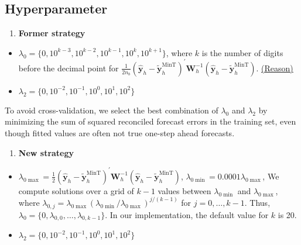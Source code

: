 \documentclass[
  letterpaper,
  DIV=11,
  numbers=noendperiod]{scrartcl}
\providecommand{\tightlist}{%
  \setlength{\itemsep}{0pt}\setlength{\parskip}{0pt}}\usepackage{longtable,booktabs,array}
\begin{document}
\hypertarget{hyperparameter}{%
\subsection{Hyperparameter}\label{hyperparameter}}

\begin{enumerate}
\def\labelenumi{\arabic{enumi}.}
\tightlist
\item
  \textbf{Former strategy}
\end{enumerate}

\begin{itemize}
\item
  \(\lambda_0 = \{0, 10^{k-3}, 10^{k-2}, 10^{k-1}, 10^{k}, 10^{k+1}\}\),
  where \(k\) is the number of digits before the decimal point for
  \(\frac{1}{2 n_b}\left(\hat{\boldsymbol{y}}_h-\tilde{\boldsymbol{y}}_h^{\text{MinT}}\right)^{\prime} \boldsymbol{W}_h^{-1}\left(\hat{\boldsymbol{y}}_h-\tilde{\boldsymbol{y}}_h^{\text{MinT}}\right)\).
  \uline{(Reason)}
\item
  \(\lambda_2 = \{0, 10^{-2}, 10^{-1}, 10^{0}, 10^{1}, 10^{2}\}\)
\end{itemize}

To avoid cross-validation, we select the best combination of
\(\lambda_0\) and \(\lambda_2\) by minimizing the sum of squared
reconciled forecast errors in the training set, even though fitted
values are often not true one-step ahead forecasts.

\begin{enumerate}
\def\labelenumi{\arabic{enumi}.}
\setcounter{enumi}{1}
\tightlist
\item
  \textbf{New strategy}
\end{enumerate}

\begin{itemize}
\item
  \(\lambda_{0\max} = \frac{1}{2}\left(\hat{\boldsymbol{y}}_h-\tilde{\boldsymbol{y}}_h^{\text{MinT}}\right)^{\prime} \boldsymbol{W}_h^{-1}\left(\hat{\boldsymbol{y}}_h-\tilde{\boldsymbol{y}}_h^{\text{MinT}}\right)\),
  \(\lambda_{0\min} = 0.0001\lambda_{0\max}\), We compute solutions over
  a grid of \(k-1\) values between \(\lambda_{0\min }\) and
  \(\lambda_{0\max }\), where
  \(\lambda_{0, j}=\lambda_{0\max }\left(\lambda_{0\min } / \lambda_{0\max }\right)^{j / (k-1)}\)
  for \(j=0, \ldots, k-1\). Thus,
  \(\lambda_0=\{0, \lambda_{0,0}, \ldots, \lambda_{0,k-1}\}\). In our
  implementation, the default value for \(k\) is 20.
\item
  \(\lambda_2 = \{0, 10^{-2}, 10^{-1}, 10^{0}, 10^{1}, 10^{2}\}\)
\end{itemize}
\end{document}
